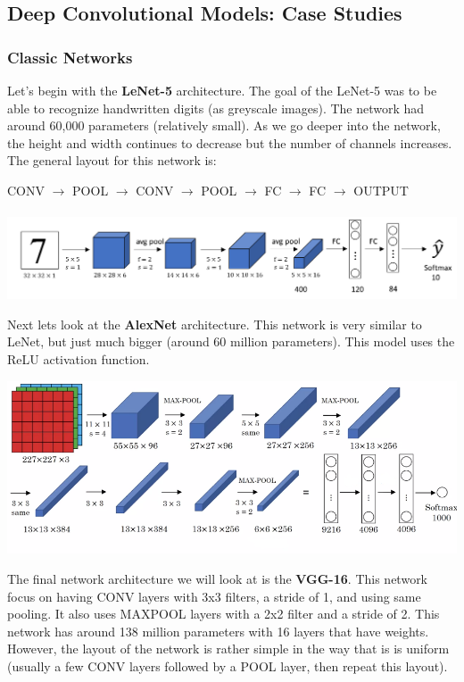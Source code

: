 \documentclass[11pt, a4paper]{article}
\begin{document}
\begin{spacing}{1.1}
	\subsection{Deep Convolutional Models: Case Studies}
	\subsubsection{Classic Networks}
	Let's begin with the \textbf{LeNet-5} architecture. The goal of the LeNet-5 was to be able to recognize handwritten digits (as greyscale images). The network had around 60,000 parameters (relatively small). As we go deeper into the network, the height and width continues to decrease but the number of channels increases. The general layout for this network is:
	\begin{center}
	CONV $\rightarrow$ POOL $\rightarrow$ CONV $\rightarrow$ POOL $\rightarrow$ FC $\rightarrow$ FC $\rightarrow$ OUTPUT \\~\\
	\includegraphics[scale=.5]{lenet_5}
	\end{center}
	Next lets look at the \textbf{AlexNet} architecture. This network is very similar to LeNet, but just much bigger (around 60 million parameters). This model uses the ReLU activation function. 
	\begin{center}	\includegraphics[scale=.6]{alex_net} 	\end{center}
	The final network architecture we will look at is the \textbf{VGG-16}. This network focus on having CONV layers with 3x3 filters, a stride of 1, and using same pooling. It also uses MAXPOOL layers with a 2x2 filter and a stride of 2. This network has around 138 million parameters with 16 layers that have weights. However, the layout of the network is rather simple in the way that is is uniform (usually a few CONV layers followed by a POOL layer, then repeat this layout). 

\end{spacing}
\end{document}
